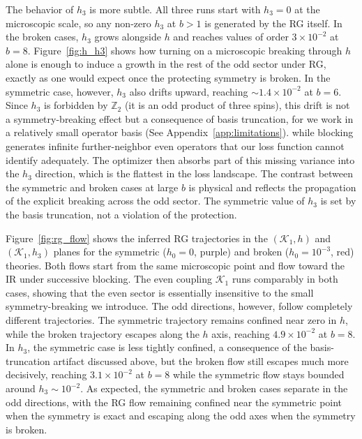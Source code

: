 \documentclass[a4paper, 11pt]{article}
\begin{document}
The behavior of $h_3$ is more subtle. All three runs start with $h_3 = 0$ at the microscopic scale, so any non-zero $h_3$ at $b > 1$ is generated by the RG itself. In the broken cases, $h_3$ grows alongside $h$ and reaches values of order $3\times 10^{-2}$ at $b = 8$. Figure~\ref{fig:h_h3} shows how turning on a microscopic breaking through $h$ alone is enough to induce a growth in the rest of the odd sector under RG, exactly as one would expect once the protecting symmetry is broken. In the symmetric case, however, $h_3$ also drifts upward, reaching $\sim 1.4\times 10^{-2}$ at $b = 6$. Since $h_3$ is forbidden by $\mathbb{Z}_2$ (it is an odd product of three spins), this drift is not a symmetry-breaking effect but a consequence of basis truncation, for we work in a relatively small operator basis (See Appendix~\ref{app:limitations}). while blocking generates infinite further-neighbor even operators that our loss function cannot identify adequately. The optimizer then absorbs part of this missing variance into the $h_3$ direction, which is the flattest in the loss landscape. The contrast between the symmetric and broken cases at large $b$ is physical and reflects the propagation of the explicit breaking across the odd sector. The symmetric value of $h_3$ is set by the basis truncation, not a violation of the protection.

Figure~\ref{fig:rg_flow} shows the inferred RG trajectories in the $(\mathcal{K}_1, h)$ and $(\mathcal{K}_1, h_3)$ planes for the symmetric ($h_0 = 0$, purple) and broken ($h_0 = 10^{-3}$, red) theories. Both flows start from the same microscopic point and flow toward the IR under successive blocking. The even coupling $\mathcal{K}_1$ runs comparably in both cases, showing that the even sector is essentially insensitive to the small symmetry-breaking we introduce. The odd directions, however, follow completely different trajectories. The symmetric trajectory remains confined near zero in $h$, while the broken trajectory escapes along the $h$ axis, reaching $4.9\times10^{-2}$ at $b = 8$. In $h_3$, the symmetric case is less tightly confined, a consequence of the basis-truncation artifact discussed above, but the broken flow still escapes much more decisively, reaching $3.1\times10^{-2}$ at $b = 8$ while the symmetric flow stays bounded around $h_3 \sim 10^{-2}$. As expected, the symmetric and broken cases separate in the odd directions, with the RG flow remaining confined near the symmetric point when the symmetry is exact and escaping along the odd axes when the symmetry is broken.
\end{document}
